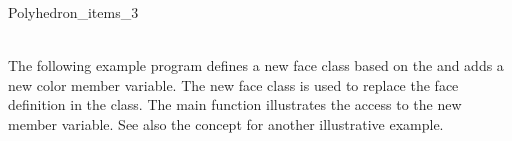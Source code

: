 \begin{ccRefClass}{Polyhedron_items_3}
\\
\\

\ccExample

The following example program defines a new face class based on the
 and adds a new color member variable.
The new face class is used to replace the face definition in the
 class. The main function illustrates the
access to the new member variable.
See also the  concept for another illustrative
example.


\end{ccRefClass}

\ccRefPageEnd

